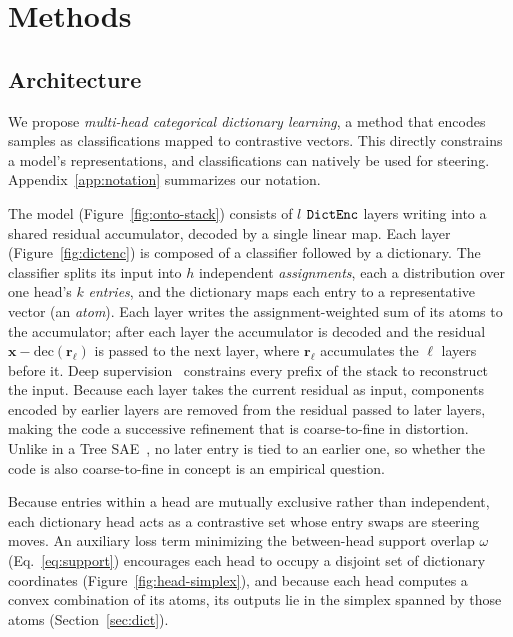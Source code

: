 \section{Methods}
\label{sec:methods}

\subsection{Architecture}
\label{sec:arch}
We propose \emph{multi-head categorical dictionary learning}, a method
that encodes samples as classifications mapped to contrastive vectors.
This directly constrains a model's representations,
and classifications can natively be used for steering.
Appendix~\ref{app:notation} summarizes our notation.

The model (Figure~\ref{fig:onto-stack}) consists of $l$ $\mathop{\mathtt{DictEnc}}\limits$
layers writing into a shared residual accumulator, decoded by a single
linear map. Each layer (Figure~\ref{fig:dictenc}) is composed of a
classifier followed by a dictionary. The classifier splits its input
into $h$ independent \emph{assignments}, each a distribution over one
head's $k$ \emph{entries}, and the dictionary maps each entry to a
representative vector (an \emph{atom}). Each layer writes the
assignment-weighted sum of its atoms to the accumulator; after each
layer the accumulator is decoded and the residual
$\mathbf{x} - \mathrm{dec}(\mathbf{r}_\ell)$ is passed to the next
layer, where $\mathbf{r}_\ell$ accumulates the $\ell$ layers before it.
Deep supervision~\cite{lee2015deeply} constrains every prefix of the
stack to reconstruct the input. Because each layer takes the current
residual as input, components encoded by earlier layers are removed from
the residual passed to later layers, making the code a successive
refinement that is coarse-to-fine in distortion. Unlike in a Tree
SAE~\cite{cao2026}, no later entry is tied to an earlier one, so whether
the code is also coarse-to-fine in concept is an empirical question.

Because entries within a head are mutually exclusive rather than
independent, each dictionary head acts as a contrastive set whose entry
swaps are steering moves. An auxiliary loss term minimizing the
between-head support overlap $\omega$ (Eq.~\eqref{eq:support}) encourages
each head to occupy a disjoint set of dictionary coordinates
(Figure~\ref{fig:head-simplex}), and because each head computes a convex
combination of its atoms, its outputs lie in the simplex spanned by
those atoms (Section~\ref{sec:dict}).

